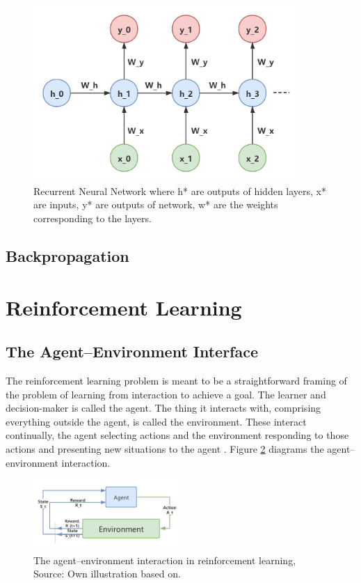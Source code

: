 \begin{figure}[htbp]
\centering
\includegraphics[width=0.9\textwidth]{./images/recurrent-layer-ann.png}
\caption{Recurrent Neural Network where h* are outputs of hidden layers, x* are inputs, y* are outputs of network, w* are the weights corresponding to the layers.}
\label{fig:recurrent-layer-ann}
\end{figure}

\subsection{Backpropagation}

\section{Reinforcement Learning}
\subsection{The Agent–Environment Interface}
The reinforcement learning problem is meant to be a straightforward framing
of the problem of learning from interaction to achieve a goal. The learner and
decision-maker is called the agent. The thing it interacts with, comprising
everything outside the agent, is called the environment. These interact continually, the agent selecting actions and the environment responding to those
actions and presenting new situations to the agent \parencite{Sutton2018}. 
Figure \ref{fig:agent-environment-interaction} diagrams the agent–environment interaction.

\begin{figure}[htbp]
\centering
\includegraphics[width=0.5\textwidth]{./images/agent-environment-interaction.png}
\caption{The agent–environment interaction in reinforcement learning, Source: Own illustration based
on\parencite{Sutton2018}.}
\label{fig:agent-environment-interaction}
\end{figure}


